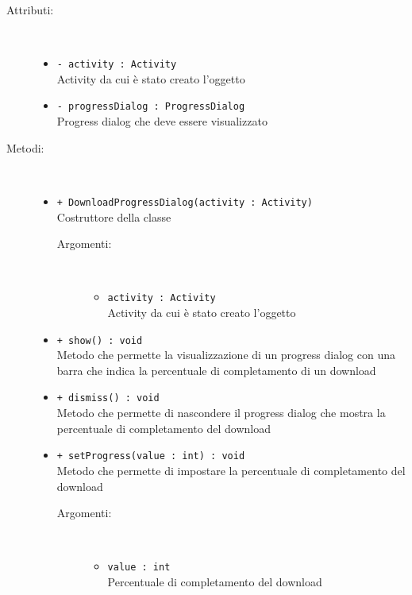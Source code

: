 \documentclass[../Tesi.tex]{subfiles}
\begin{document}
		\begin{description}
			\item[Attributi:] \
			\begin{itemize}
				\item \texttt{- activity : Activity}\\
				Activity da cui è stato creato l'oggetto

				\item \texttt{- progressDialog : ProgressDialog}\\
				Progress dialog che deve essere visualizzato 
			\end{itemize}

			\item[Metodi:] \
			\begin{itemize}
				\item \texttt{+ DownloadProgressDialog(activity : Activity)}\\
				Costruttore della classe 
				\begin{description}
					\item[Argomenti:] \
					\begin{itemize}
						\item \texttt{activity : Activity}\\
						Activity da cui è stato creato l'oggetto
					\end{itemize}
				\end{description}

				\item \texttt{+ show() : void}\\
				Metodo che permette la visualizzazione di un progress dialog con una barra che indica la percentuale di completamento di un download

				\item \texttt{+ dismiss() : void}\\
				Metodo che permette di nascondere il progress dialog che mostra la percentuale di completamento del download
				
				\item \texttt{+ setProgress(value : int) : void}\\
				Metodo che permette di impostare la percentuale di completamento del download
				\begin{description}
					\item[Argomenti:] \
					\begin{itemize}
						\item \texttt{value : int}\\
						Percentuale di completamento del download
					\end{itemize}
				\end{description}


\end{itemize}
\end{description}
\end{document}
